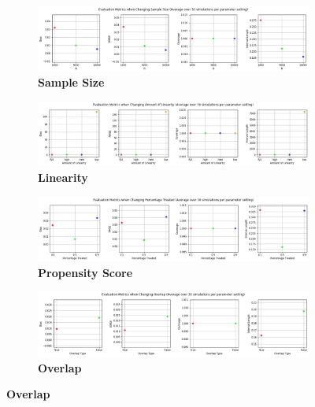 \documentclass[12pt]{article}
\begin{document}
\begin{figure}[!htp]
\caption{Relative Model Performance by Parameter Variation }
	\centering
	\begin{subfigure} [h] {\linewidth}
		\caption{\textbf{Sample Size}}
   	 	\includegraphics[width = \linewidth]{Graphs/s2_nsiz.png}
	\end{subfigure}
	\begin{subfigure} [h] {\linewidth}
\vspace{0.5cm}
		\caption{\textbf{Linearity}}
   	 	\includegraphics[width = \linewidth]{Graphs/s2_linear.png}
	\end{subfigure}
	\begin{subfigure} [h] {\linewidth}
\vspace{0.5cm}
		\caption{\textbf{Propensity Score}}
   	 	\includegraphics[width = \linewidth]{Graphs/s2_propen.png}
	\end{subfigure}
	\begin{subfigure} [h] {\linewidth}
\vspace{0.5cm}
		\caption{\textbf{Overlap}}
   	 	\includegraphics[width = \linewidth]{Graphs/s2_overlap.png}
	\end{subfigure}
\end{figure} 
\end{document}
